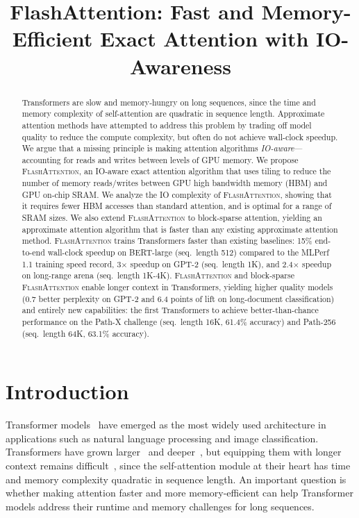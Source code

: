 \title{FlashAttention: Fast and Memory-Efficient Exact Attention with IO-Awareness}

\begin{abstract}
Transformers are slow and memory-hungry on long sequences, since the time and memory complexity of self-attention are quadratic in sequence length. Approximate attention methods have attempted to address this problem by trading off model quality to reduce the compute complexity, but often do not achieve wall-clock speedup. We argue that a missing principle is making attention algorithms \textit{IO-aware}---accounting for reads and writes between levels of GPU memory. We propose \textsc{FlashAttention}, an IO-aware exact attention algorithm that uses tiling to reduce the number of memory reads/writes between GPU high bandwidth memory (HBM) and GPU on-chip SRAM. We analyze the IO complexity of \textsc{FlashAttention}, showing that it requires fewer HBM accesses than standard attention, and is optimal for a range of SRAM sizes. We also extend \textsc{FlashAttention} to block-sparse attention, yielding an approximate attention algorithm that is faster than any existing approximate attention method.
\textsc{FlashAttention} trains Transformers faster than existing baselines: 15\% end-to-end wall-clock speedup on BERT-large (seq.\ length 512) compared to the MLPerf 1.1 training speed record, 3$\times$ speedup on GPT-2 (seq.\ length 1K), and 2.4$\times$ speedup on long-range arena (seq.\ length 1K-4K).
\textsc{FlashAttention} and block-sparse \textsc{FlashAttention} enable longer context in Transformers, yielding higher quality models (0.7 better perplexity on GPT-2 and 6.4 points of lift on long-document classification) and entirely new capabilities: the first Transformers to achieve better-than-chance performance on the Path-X challenge (seq.\ length 16K, 61.4\% accuracy) and Path-256 (seq.\ length 64K, 63.1\% accuracy).
\end{abstract}

\section{Introduction}
\label{sec:intro}

Transformer models~\citep{vaswani2017attention} have emerged as the most widely used architecture in applications such as natural language processing and image classification. Transformers have grown larger~\citep{brown2020language} and deeper~\citep{wang2022deepnet}, but equipping them with longer context remains difficult~\citep{tay2020long}, since the self-attention module at their heart has time and memory complexity quadratic in sequence length. An important question is whether making attention faster and more memory-efficient can help Transformer models address their runtime and memory challenges for long sequences.

